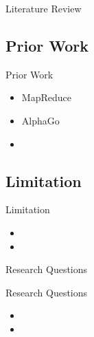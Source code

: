 \documentclass{beamer}
\begin{document}
\begin{section}{Literature Review}              %
    \subsection{Prior Work}                     %
    \begin{frame}{Prior Work}
        \begin{itemize}
            \item MapReduce\cite{dean2008mapreduce}
            \item AlphaGo\cite{silver2016mastering}
            \item
        \end{itemize}
    \end{frame}

    \subsection{Limitation}                     %
    \begin{frame}{Limitation}
        \begin{itemize}
            \item
            \item
        \end{itemize}
    \end{frame}
\end{section}

\begin{section}{Research Questions}             %
    \begin{frame}{Research Questions}
        \begin{itemize}
            \item
            \item
        \end{itemize}
    \end{frame}
\end{section}
\end{document}
